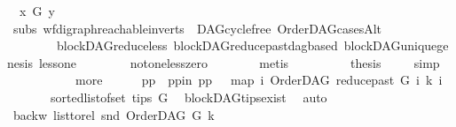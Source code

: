 \begin{isabellebody}
\ {\isachardoublequoteopen}{\isasymnot}\ x\ {\isasymrightarrow}\isactrlsup {\isacharplus}{\kern0pt}\isactrlbsub G\isactrlesub \ y{\isachardoublequoteclose}\isanewline
\ \ \ \ \ \ \isamarkupfalse%
\ subs{\isacharparenleft}{\kern0pt}{}{\isacharcomma}{\kern0pt}{}{\isacharparenright}{\kern0pt}\ wf{\isacharunderscore}{\kern0pt}digraph{\isachardot}{\kern0pt}reachable{}{\isacharunderscore}{\kern0pt}in{\isacharunderscore}{\kern0pt}verts\ {}\ DAG{\isachardot}{\kern0pt}cycle{\isacharunderscore}{\kern0pt}free\ OrderDAG{\isacharunderscore}{\kern0pt}casesAlt\isanewline
\ \ \ \ \ \ \ \ blockDAG{\isachardot}{\kern0pt}reduce{\isacharunderscore}{\kern0pt}less\ blockDAG{\isachardot}{\kern0pt}reduce{\isacharunderscore}{\kern0pt}past{\isacharunderscore}{\kern0pt}dagbased\ blockDAG{\isachardot}{\kern0pt}unique{\isacharunderscore}{\kern0pt}genesis\ less{\isacharunderscore}{\kern0pt}one\isanewline
\ \ \ \ \ \ \ \ not{\isacharunderscore}{\kern0pt}one{\isacharunderscore}{\kern0pt}less{\isacharunderscore}{\kern0pt}zero\isanewline
\ \ \ \ \ \ \isamarkupfalse%
\ metis\ \ \isanewline
\ \ \ \ \isamarkupfalse%
\ \isamarkupfalse%
\ {\isacharquery}{\kern0pt}thesis\ \isamarkupfalse%
\ {}\ \isamarkupfalse%
\ simp\isanewline
\ \ \isamarkupfalse%
\ \ \isanewline
\ \ \ \ \isamarkupfalse%
\ more\isanewline
\ \ \ \ \isamarkupfalse%
\ pp\ \ pp{\isacharunderscore}{\kern0pt}in{\isacharcolon}{\kern0pt}\ {\isachardoublequoteopen}pp\ {\isacharequal}{\kern0pt}\ \ {\isacharparenleft}{\kern0pt}map\ {\isacharparenleft}{\kern0pt}{\isasymlambda}i{\isachardot}{\kern0pt}\ {\isacharparenleft}{\kern0pt}OrderDAG\ {\isacharparenleft}{\kern0pt}reduce{\isacharunderscore}{\kern0pt}past\ G\ i{\isacharparenright}{\kern0pt}\ k{\isacharcomma}{\kern0pt}\ i{\isacharparenright}{\kern0pt}{\isacharparenright}{\kern0pt}\isanewline
\ \ \ \ \ \ \ {\isacharparenleft}{\kern0pt}sorted{\isacharunderscore}{\kern0pt}list{\isacharunderscore}{\kern0pt}of{\isacharunderscore}{\kern0pt}set\ {\isacharparenleft}{\kern0pt}tips\ G{\isacharparenright}{\kern0pt}{\isacharparenright}{\kern0pt}{\isacharparenright}{\kern0pt}{\isachardoublequoteclose}\ \isamarkupfalse%
\ blockDAG{\isachardot}{\kern0pt}tips{\isacharunderscore}{\kern0pt}exist\ \isamarkupfalse%
\ auto\isanewline
\ \ \ \ \isamarkupfalse%
\ backw{\isacharcolon}{\kern0pt}\ {\isachardoublequoteopen}list{\isacharunderscore}{\kern0pt}to{\isacharunderscore}{\kern0pt}rel\ {\isacharparenleft}{\kern0pt}snd\ {\isacharparenleft}{\kern0pt}OrderDAG\ G\ k{\isacharparenright}{\kern0pt}{\isacharparenright}{\kern0pt}\ {\isacharequal}{\kern0pt}\ \isanewline

\end{isabellebody}
